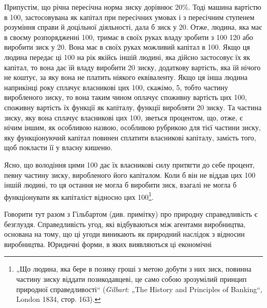 Припустім, що річна пересічна норма зиску дорівнює 20\%.
Тоді машина вартістю в 100, застосовувана
як капітал при пересічних умовах і з пересічним ступенем розуміння
справи й доцільної діяльності, дала б зиск у 20. Отже, людина, яка має в своєму розпорядженні
100, тримає в своїх руках владу зробити
з 100 120 або виробити зиск у 20.
Вона має в своїх руках можливий капітал в 100. Якщо ця людина передає ці 100
на рік якійсь іншій людині, яка дійсно застосовує їх як капітал,
то вона дає їй владу виробити 20 зиску, додаткову
вартість, яка їй нічого не коштує, за яку вона не платить
ніякого еквіваленту. Якщо ця інша людина наприкінці
року сплачує власникові цих 100, скажімо,
5, тобто частину виробленого зиску, то вона
таким чином оплачує споживну вартість цих 100,
споживну вартість їх функції як капіталу, функції виробляти
20 зиску. Та частина зиску, яку вона
сплачує власникові цих 100, зветься процентом,
що, отже, є нічим іншим, як особливою назвою, особливою
рубрикою для тієї частини зиску, яку функціонуючий капітал
повинен сплатити власникові капіталу, замість того, щоб покласти
її у власну кишеню.

Ясно, що володіння цими 100 дає їх
власникові силу притягти до себе процент, певну частину
зиску, виробленого його капіталом. Коли б він не віддав цих
100 іншій людині, то ця остання не могла б
виробити зиск, взагалі не могла б функціонувати як капіталіст
відносно цих 100\footnote{„Що людина, яка бере в позику гроші з метою добути з них зиск, повинна
частину зиску віддати позикодавцеві, це само собою зрозумілий принцип
природної справедливості“ (\emph{Gilbart}: „The History and Principles of Banking“,
London 1834, стор. 163).}.

Говорити тут разом з Гільбартом (див. примітку) про природну
справедливість є безглуздя. Справедливість угод, які
відбуваються між агентами виробництва, основана на тому, що
ці угоди виникають як природний наслідок з відносин виробництва.
Юридичні форми, в яких виявляються ці економічні
\parbreak{}  %
